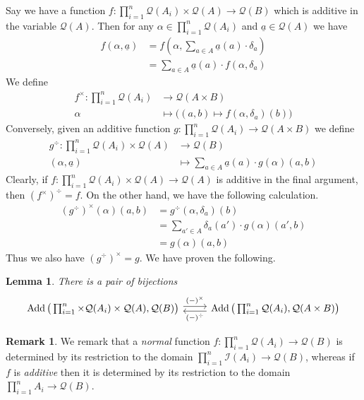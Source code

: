 \documentclass[12pt]{article}
\theoremstyle{plain}
\newtheorem{lemma}[thm]{Lemma}
\theoremstyle{definition}
\newtheorem{remark}[thm]{Remark}
\newcommand{\call}[1]{\mathcal{#1}}
\newcommand{\Ical}{\call{I}}
\newcommand{\Qcal}{\call{Q}}
\newcommand{\lto}{\longrightarrow}
\begin{document}
Say we have a function $f: \prod_{i = 1}^n \call{Q}(A_i) \times \call{Q}(A) \lto \call{Q}(B)$ which is additive in the variable $\call{Q}(A)$. Then for any $\alpha \in \prod_{i = 1}^n\call{Q}(A_i)$ and $\underline{a} \in \call{Q}(A)$ we have
\begin{align*}
	f(\alpha, \underline{a}) &= f(\alpha, \sum_{a \in A}\underline{a}(a)\cdot \delta_a)\\
	&= \sum_{a \in A}\underline{a}(a) \cdot f(\alpha, \delta_a)
\end{align*}
We define
\begin{align*}
	f^\times: \prod_{i = 1}^n \call{Q}(A_i) &\lto \call{Q}(A \times B)\\
	\alpha &\longmapsto \big( (a, b) \mapsto f(\alpha, \delta_{a})(b)\big)
\end{align*}
Conversely, given an additive function $g: \prod_{i = 1}^{n}\call{Q}(A_i) \lto \call{Q}(A \times B)$ we define
\begin{align*}
	g^\div: \prod_{i = 1}^n\call{Q}(A_i) \times \call{Q}(A) &\lto \call{Q}(B)\\
(\alpha, \underline{a}) &\longmapsto \sum_{a \in A}\underline{a}(a) \cdot g(\alpha)(a,b)
\end{align*}
Clearly, if $f: \prod_{i = 1}^n\call{Q}(A_i) \times \call{Q}(A) \lto \call{Q}(A)$ is additive in the final argument, then $(f^\times)^\div = f$. On the other hand, we have the following calculation.
\begin{align*}
(g^\div)^\times(\alpha)(a,b) &= g^\div(\alpha, \delta_a)(b)\\
&= \sum_{a' \in A}\delta_{a}(a')\cdot g(\alpha)(a',b)\\
&= g(\alpha)(a,b)
\end{align*}
Thus we also have $(g^\div)^\times = g$. We have proven the following.
\begin{lemma}
There is a pair of bijections
\begin{equation}
\begin{tikzcd}
\operatorname{Add}\big(\prod_{i = 1}^n \times \call{Q}(A_i) \times \call{Q}(A), \call{Q}(B)\big)\arrow[r, shift left, "{(-)^\times}"] & \operatorname{Add}\big(\prod_{i = 1}^n\call{Q}(A_i), \call{Q}(A \times B)\big)\arrow[l, shift left, "{(-)^\div}"]
\end{tikzcd}
\end{equation}
\end{lemma}
	
	\begin{remark}
		We remark that a \emph{normal} function $f: \prod_{i=1}^n \Qcal(A_i) \lto \Qcal(B)$ is determined by its restriction to the domain $\prod_{i=1}^n\Ical(A_i) \lto \Qcal(B)$, whereas if $f$ is \emph{additive} then it is determined by its restriction to the domain $\prod_{i=1}^n A_i \lto \Qcal(B)$.
		\end{remark}
\end{document}
